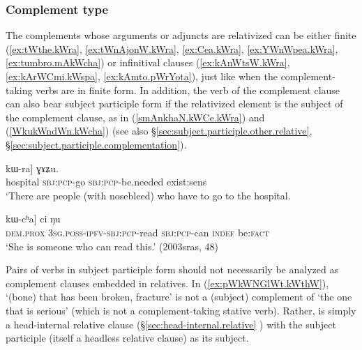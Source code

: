  
\subsubsection{Complement type} \label{sec:relativization.complement.type}
The complements whose arguments or adjuncts are relativized can be either finite (\ref{ex:tWthe.kWra}, \ref{ex:tWnAjonW.kWra}, \ref{ex:Cea.kWra}, \ref{ex:YWnWpea.kWra}, \ref{ex:tumbro.mAkWcha}) or infinitival clauses (\ref{ex:kAnWtsW.kWra}, \ref{ex:kArWCmi.kWspa}, \ref{ex:kAmto.pWrYota}), just like when the complement-taking verbs are in finite form. In addition, the verb of the complement clause can also bear subject participle form if the relativized element is the subject of the complement clause, as in (\ref{smAnkhaN.kWCe.kWra}) and (\ref{WkukWndWn.kWcha}) (see also §\ref{sec:subject.participle.other.relative}, §\ref{sec:subject.participle.complementation}).

\begin{exe}
\ex \label{smAnkhaN.kWCe.kWra}
\gll  [[smɤnkʰaŋ kɯ-ɕe] kɯ-ra] ɣɤʑu. \\
hospital \textsc{sbj}:\textsc{pcp}-go \textsc{sbj}:\textsc{pcp}-be.needed exist:sens \\
\glt `There are people (with nosebleed) who have to go to the hospital. \\
\end{exe}
 
\begin{exe}
\ex \label{WkukWndWn.kWcha}
\gll  [[kɯki ɯ-ku-kɯ-ndɯn] kɯ-cʰa] ci ŋu \\
\textsc{dem}.\textsc{prox} \textsc{3sg}.\textsc{poss}-\textsc{ipfv}-\textsc{sbj}:\textsc{pcp}-read \textsc{sbj}:\textsc{pcp}-can \textsc{indef} be:\textsc{fact} \\
\glt `She is someone who can read this.' (2003sras, 48)
\end{exe}

Pairs of verbs in subject participle form should not necessarily be analyzed as complement clauses embedded in relatives. In (\ref{ex:pWkWNGlWt.kWthW}),  `(bone) that has been broken, fracture' is not a (subject) complement of   `the one that is serious' (which is not a complement-taking stative verb). Rather,  is simply a head-internal relative clause (§\ref{sec:head-internal.relative} ) with the subject participle (itself a headless relative clause)  as its subject. 

